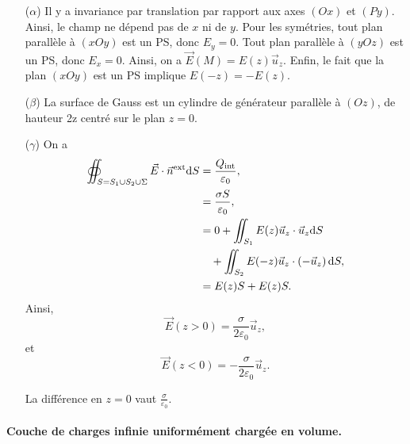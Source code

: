             \begin{itemize}
                \item [($\alpha$)] Il y a invariance par translation par rapport aux axes $(Ox)$ et $(Py)$. Ainsi, le champ ne dépend pas de $x$ ni de $y$. Pour les symétries, tout plan parallèle à $(xOy)$ est un PS, donc $E_y=0$. Tout plan parallèle à $(yOz)$ est un PS, donc $E_x=0$. Ainsi, on a $\vec{E}(M)=E(z)\vec{u}_z$.
                Enfin, le fait que la plan $(xOy)$ est un PS implique $E(-z)=-E(z)$.

                \item [($\beta$)] La surface de Gauss est un cylindre de générateur parallèle à $(Oz)$, de hauteur 2z centré sur le plan $z=0$.
                
                \item [($\gamma$)] On a 
                \begin{align}
                    \oiint_{S=S_1\cup S_2\cup \Sigma}\vec{E}\cdot\vec{n}^{\text{ext}}\mathrm{d} S
                    &=\frac{Q_{\text{int}}}{\varepsilon_0},\\
                    &=\frac{\sigma S}{\varepsilon_0},\\
                    &=0+\iint_{S_1}E(z)\vec{u}_z\cdot\vec{u}_z\mathrm{d} S\\
                    &\quad+\iint_{S_2}E(-z)\vec{u}_z\cdot\left(-\vec{u}_z\right)\mathrm{d} S,\\
                    &=
                    E(z)S+E(z)S.
                \end{align}
                Ainsi, 
                \begin{equation}
                    \boxed{\vec{E}(z>0)=\frac{\sigma}{2\varepsilon_0}\vec{u}_z,}
                \end{equation}
                et 
                \begin{equation}
                    \boxed{\vec{E}(z<0)=-\frac{\sigma}{2\varepsilon_0}\vec{u}_z.}
                \end{equation}
                
                La différence en $z=0$ vaut $\frac{\sigma}{\varepsilon_0}$.
            \end{itemize}

            \paragraph{Couche de charges infinie uniformément chargée en volume.}


